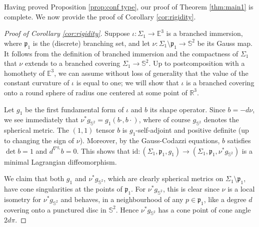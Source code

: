 \documentclass[JEP,XML,SOM,Unicode,NoEqCountersInSection,published]{cedram}
\theoremstyle{definition}
\newcommand{\R}{{\mathbb R}}
\newcommand{\E}{\mathbb{E}}
\begin{document}
Having proved Proposition \ref{prop:conf type}, our proof of Theorem \ref{thm:main1} is complete. We now provide the proof of Corollary \ref{cor:rigidity}.

\begin{proof}[Proof of Corollary \ref{cor:rigidity}]
Suppose $\iota:\Sigma_1\to\E^3$ is a branched immersion, where $\mathfrak p_1$ is the (discrete) branching set, and let $\nu:\Sigma_1\setminus\mathfrak p_1\to\mathbb S^2$ be its Gauss map. It follows from the definition of branched immersion and the compactness of $\Sigma_1$ that $\nu$ extends to a branched covering $\Sigma_1\to\mathbb S^2$. Up to {postcomposition with a homothety of $\E^3$}, we can assume without loss of generality that the value of the constant curvature of $\iota$ is equal to one; we will show that $\iota$ is a branched covering onto a round sphere of radius one centered at some point of $\R^3$.

Let $g_1$ be the first fundamental form of $\iota$ and $b$ its shape operator. Since $b=-d\nu$, we see immediately that $\nu^*g_{\mathbb S^2}=g_1(b\cdot,b\cdot)$, where of course $g_{\mathbb S^2}$ denotes the spherical metric. The $(1,1)$ tensor $b$ is $g_1$-self-adjoint and positive definite (up to changing the sign of $\nu$). Moreover, by the Gauss-Codazzi equations, $b$ satisfies $\det b=1$ and $d^{\nabla^{g_1}}\!b=0$. This shows that $\mathrm{id}:(\Sigma_1,\mathfrak p_1,g_1)\to (\Sigma_1,\mathfrak p_1,\nu^*g_{\mathbb S^2})$ is a minimal Lagrangian diffeomorphism.

We claim that both $g_1$ and $\nu^*g_{\mathbb S^2}$, which are clearly spherical metrics on $\Sigma_1\setminus \mathfrak p_1$, have cone singularities at the points of $\mathfrak p_1$. For $\nu^*g_{\mathbb S^2}$, this is clear since $\nu$ is a local isometry for $\nu^*g_{\mathbb S^2}$ and behaves, in a neighbourhood of any $p\in\mathfrak p_1$, like a degree $d$ covering onto a punctured disc in $\mathbb S^2$. Hence $\nu^*g_{\mathbb S^2}$ has a cone point of cone angle $2d\pi$.


\end{proof}
\end{document}
